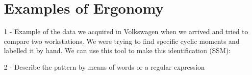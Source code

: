 
%

\chapter{Examples of Ergonomy}
\label{cha:data}


1 - Example of the data we acquired in Volkswagen when we arrived and tried to compare two workstations. We were trying to find specific cyclic moments and labelled it by hand. We can use this tool to make this identification (SSM):


2 - Describe the pattern by means of words or a regular expression

